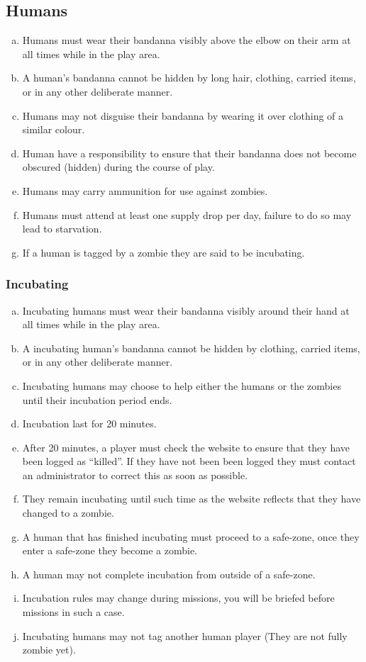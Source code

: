 \documentclass[a4paper,12pt]{article}
\begin{document}
\subsection{Humans}

\begin{enumerate}[(a)]
    \item Humans must wear their bandanna visibly above the elbow on their arm at all times while in the play area.
    \item A human's bandanna cannot be hidden by long hair, clothing, carried items, or in any other deliberate manner.
    \item Humans may not disguise their bandanna by wearing it over clothing of a similar colour.
    \item Human have a responsibility to ensure that their bandanna does not become obscured (hidden) during the course of play.
    \item Humans may carry ammunition for use against zombies.
    \item Humans must attend at least one supply drop per day, failure to do so may lead to starvation.
    \item If a human is tagged by a zombie they are said to be incubating.
\end{enumerate}

\subsubsection{Incubating}
\label{Incubating}
\begin{enumerate}[(a)]
    \item Incubating humans must wear their bandanna visibly around their hand at all times while in the play area.
    \item A incubating human's bandanna cannot be hidden by clothing, carried items, or in any other deliberate manner.
    \item Incubating humans may choose to help either the humans or the zombies until their incubation period ends.
    \item Incubation last for 20 minutes.
    \item After 20 minutes, a player must check the website to ensure that they have been logged as ``killed''. If they have not been been logged they must contact an administrator to correct this as soon as possible.
    \item They remain incubating until such time as the website reflects that they have changed to a zombie.
    \item A human that has finished incubating must proceed to a safe-zone, once they enter a safe-zone they become a zombie.
    \item A human may not complete incubation from outside of a safe-zone.
    \item Incubation rules may change during missions, you will be briefed before missions in such a case.
    \item Incubating humans may not tag another human player (They are not fully zombie yet).
\end{enumerate}
\end{document}
